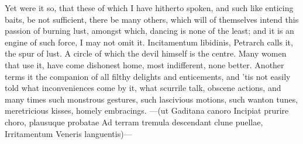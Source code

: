 {Yet were it so, that these of which I have hitherto spoken, and such
like enticing baits, be not sufficient, there be many others, which
will of themselves intend this passion of burning lust, amongst which,
dancing is none of the least; and it is an engine of such force, I may
not omit it. Incitamentum libidinis, Petrarch calls it, the spur of
lust. A  circle of which the devil himself is the centre.
Many women that use it, have come dishonest home, most
indifferent, none better.  Another terms it the companion of all
filthy delights and enticements, and 'tis not easily told what
inconveniences come by it, what scurrile talk, obscene actions, and
many times such monstrous gestures, such lascivious motions, such
wanton tunes, meretricious kisses, homely embracings.
---(ut Gaditana canoro
Incipiat prurire choro, plausuque probatae
Ad terram tremula descendant clune puellae,
Irritamentum Veneris languentis)---

}

